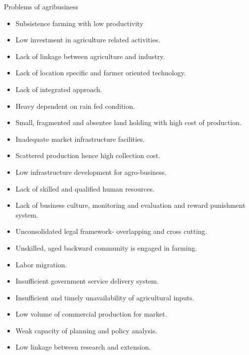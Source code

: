 \documentclass[12pt,ignorenonframetext,aspectratio=169]{beamer}
\providecommand{\tightlist}{%
  \setlength{\itemsep}{0pt}\setlength{\parskip}{0pt}}
\begin{document}
\begin{frame}{Problems of agribusiness}
\protect\hypertarget{problems-of-agribusiness}{}
\begin{itemize}
\tightlist
\item
  Subsistence farming with low productivity
\item
  Low investment in agriculture related activities.
\item
  Lack of linkage between agriculture and industry.
\item
  Lack of location specific and farmer oriented technology.
\item
  Lack of integrated approach.
\item
  Heavy dependent on rain fed condition.
\item
  Small, fragmented and absentee land holding with high cost of
  production.
\item
  Inadequate market infrastructure facilities.
\item
  Scattered production hence high collection cost.
\item
  Low infrastructure development for agro-business.
\end{itemize}
\end{frame}

\begin{frame}{}
\protect\hypertarget{section-4}{}
\begin{itemize}
\tightlist
\item
  Lack of skilled and qualified human resources.
\item
  Lack of business culture, monitoring and evaluation and reward
  punishment system.
\item
  Unconsolidated legal framework- overlapping and cross cutting.
\item
  Unskilled, aged backward community is engaged in farming.
\item
  Labor migration.
\item
  Insufficient government service delivery system.
\item
  Insufficient and timely unavailability of agricultural inputs.
\item
  Low volume of commercial production for market.
\item
  Weak capacity of planning and policy analysis.
\item
  Low linkage between research and extension.
\end{itemize}
\end{frame}
\end{document}
